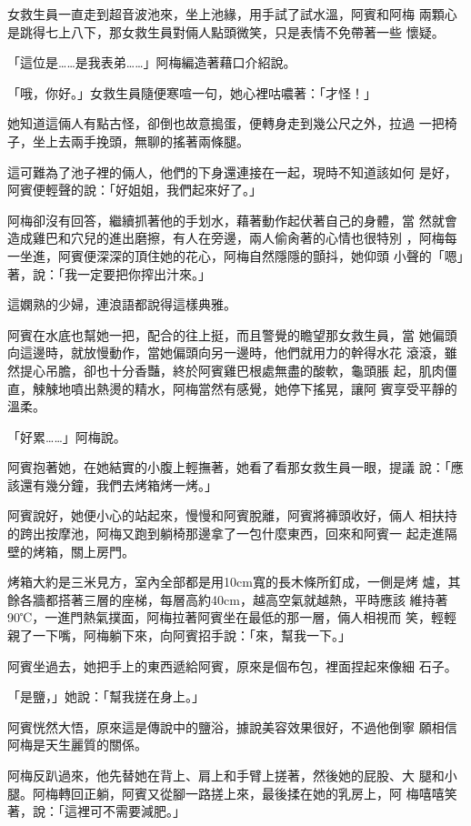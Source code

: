 女救生員一直走到超音波池來，坐上池緣，用手試了試水溫，阿賓和阿梅
兩顆心是跳得七上八下，那女救生員對倆人點頭微笑，只是表情不免帶著一些
懷疑。

「這位是……是我表弟……」阿梅編造著藉口介紹說。

「哦，你好。」女救生員隨便寒喧一句，她心裡咕噥著：「才怪！」

她知道這倆人有點古怪，卻倒也故意搗蛋，便轉身走到幾公尺之外，拉過
一把椅子，坐上去兩手挽頭，無聊的搖著兩條腿。

這可難為了池子裡的倆人，他們的下身還連接在一起，現時不知道該如何
是好，阿賓便輕聲的說：「好姐姐，我們起來好了。」

阿梅卻沒有回答，繼續抓著他的手划水，藉著動作起伏著自己的身體，當
然就會造成雞巴和穴兒的進出磨擦，有人在旁邊，兩人偷肏著的心情也很特別
，阿梅每一坐進，阿賓便深深的頂住她的花心，阿梅自然隱隱的顫抖，她仰頭
小聲的「嗯」著，說：「我一定要把你搾出汁來。」

這嫻熟的少婦，連浪語都說得這樣典雅。

阿賓在水底也幫她一把，配合的往上挺，而且警覺的瞻望那女救生員，當
她偏頭向這邊時，就放慢動作，當她偏頭向另一邊時，他們就用力的幹得水花
滾滾，雖然提心吊膽，卻也十分香豔，終於阿賓雞巴根處無盡的酸軟，龜頭脹
起，肌肉僵直，觫觫地噴出熱燙的精水，阿梅當然有感覺，她停下搖晃，讓阿
賓享受平靜的溫柔。

「好累……」阿梅說。

阿賓抱著她，在她結實的小腹上輕撫著，她看了看那女救生員一眼，提議
說：「應該還有幾分鐘，我們去烤箱烤一烤。」

阿賓說好，她便小心的站起來，慢慢和阿賓脫離，阿賓將褲頭收好，倆人
相扶持的跨出按摩池，阿梅又跑到躺椅那邊拿了一包什麼東西，回來和阿賓一
起走進隔壁的烤箱，關上房門。

烤箱大約是三米見方，室內全部都是用10cm寬的長木條所釘成，一側是烤
爐，其餘各牆都搭著三層的座梯，每層高約40cm，越高空氣就越熱，平時應該
維持著90℃，一進門熱氣撲面，阿梅拉著阿賓坐在最低的那一層，倆人相視而
笑，輕輕親了一下嘴，阿梅躺下來，向阿賓招手說：「來，幫我一下。」

阿賓坐過去，她把手上的東西遞給阿賓，原來是個布包，裡面捏起來像細
石子。

「是鹽，」她說：「幫我搓在身上。」

阿賓恍然大悟，原來這是傳說中的鹽浴，據說美容效果很好，不過他倒寧
願相信阿梅是天生麗質的關係。

阿梅反趴過來，他先替她在背上、肩上和手臂上搓著，然後她的屁股、大
腿和小腿。阿梅轉回正躺，阿賓又從腳一路搓上來，最後揉在她的乳房上，阿
梅嘻嘻笑著，說：「這裡可不需要減肥。」

